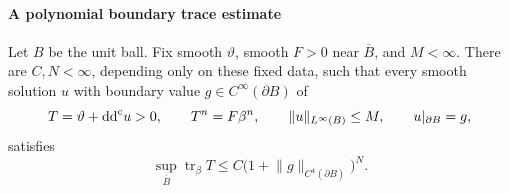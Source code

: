 \paragraph{A polynomial boundary trace estimate}

\begin{proposition}\label{prop:interior-global-trace}
Let $B$ be the unit ball. Fix smooth $\vartheta$, smooth $F>0$ near $\overline B$, and $M<\infty$. There are $C,N<\infty$, depending only on these fixed data, such that every smooth solution $u$ with boundary value $g\in C^\infty(\partial B)$ of
\[
  T=\vartheta+\mathrm{dd}^{\mathrm{c}} u>0,
  \qquad T^n=F\beta^n,
  \qquad \lVert u\rVert_{L^\infty(B)}\leq M,
  \qquad u|_{\partial B}=g,
\]
satisfies
\begin{equation}\label{eq:interior-polynomial-global-trace}
  \sup_{\overline B}\operatorname{tr}_\beta T
  \leq C\bigl(1+\lVert g\rVert_{C^4(\partial B)}\bigr)^N.
\end{equation}
\end{proposition}

